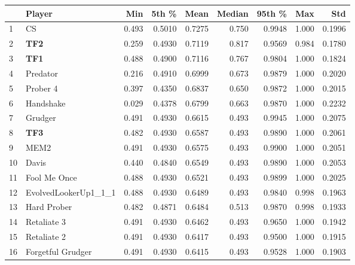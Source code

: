 \begin{tabular}{llrrrrrrr}
\toprule
{} &                Player &    Min &   5th \% &    Mean &  Median &  95th \% &    Max &     Std \\
\midrule
1  &                    CS &  0.493 &  0.5010 &  0.7275 &   0.750 &  0.9948 &  1.000 &  0.1996 \\
2  &                   \textbf{TF2} &  0.259 &  0.4930 &  0.7119 &   0.817 &  0.9569 &  0.984 &  0.1780 \\
3  &                   \textbf{TF1} &  0.488 &  0.4900 &  0.7116 &   0.767 &  0.9804 &  1.000 &  0.1824 \\
4  &              Predator &  0.216 &  0.4910 &  0.6999 &   0.673 &  0.9879 &  1.000 &  0.2020 \\
5  &              Prober 4 &  0.397 &  0.4350 &  0.6837 &   0.650 &  0.9872 &  1.000 &  0.2015 \\
6  &             Handshake &  0.029 &  0.4378 &  0.6799 &   0.663 &  0.9870 &  1.000 &  0.2232 \\
7  &               Grudger &  0.491 &  0.4930 &  0.6615 &   0.493 &  0.9945 &  1.000 &  0.2075 \\
8  &                   \textbf{TF3} &  0.482 &  0.4930 &  0.6587 &   0.493 &  0.9890 &  1.000 &  0.2061 \\
9  &                  MEM2 &  0.491 &  0.4930 &  0.6575 &   0.493 &  0.9900 &  1.000 &  0.2051 \\
10 &                 Davis &  0.440 &  0.4840 &  0.6549 &   0.493 &  0.9890 &  1.000 &  0.2053 \\
11 &          Fool Me Once &  0.488 &  0.4930 &  0.6521 &   0.493 &  0.9899 &  1.000 &  0.2025 \\
12 &  EvolvedLookerUp1\_1\_1 &  0.488 &  0.4930 &  0.6489 &   0.493 &  0.9840 &  0.998 &  0.1963 \\
13 &           Hard Prober &  0.482 &  0.4871 &  0.6484 &   0.513 &  0.9870 &  0.998 &  0.1933 \\
14 &           Retaliate 3 &  0.491 &  0.4930 &  0.6462 &   0.493 &  0.9650 &  1.000 &  0.1942 \\
15 &           Retaliate 2 &  0.491 &  0.4930 &  0.6417 &   0.493 &  0.9500 &  1.000 &  0.1915 \\
16 &     Forgetful Grudger &  0.491 &  0.4930 &  0.6415 &   0.493 &  0.9528 &  1.000 &  0.1903 \\
\bottomrule
\end{tabular}
